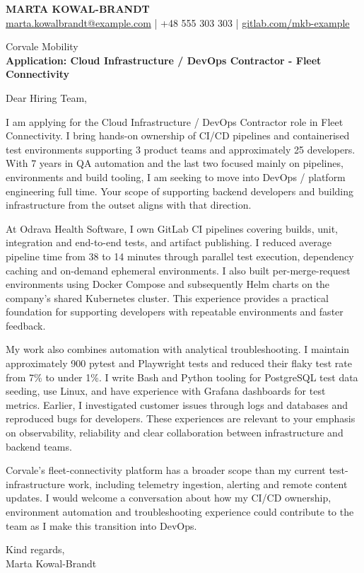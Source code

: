 \documentclass[11pt,a4paper]{article}
\begin{document}
{\Large\bfseries\color{primarycolor} MARTA KOWAL-BRANDT}\\
{\small \href{mailto:marta.kowalbrandt@example.com}{marta.kowalbrandt@example.com} | +48 555 303 303 | \href{https://gitlab.com/mkb-example}{gitlab.com/mkb-example}}

Corvale Mobility\\
\textbf{Application: Cloud Infrastructure / DevOps Contractor - Fleet Connectivity}

Dear Hiring Team,

I am applying for the Cloud Infrastructure / DevOps Contractor role in Fleet Connectivity. I bring hands-on ownership of CI/CD pipelines and containerised test environments supporting 3 product teams and approximately 25 developers. With 7 years in QA automation and the last two focused mainly on pipelines, environments and build tooling, I am seeking to move into DevOps / platform engineering full time. Your scope of supporting backend developers and building infrastructure from the outset aligns with that direction.

At Odrava Health Software, I own GitLab CI pipelines covering builds, unit, integration and end-to-end tests, and artifact publishing. I reduced average pipeline time from 38 to 14 minutes through parallel test execution, dependency caching and on-demand ephemeral environments. I also built per-merge-request environments using Docker Compose and subsequently Helm charts on the company's shared Kubernetes cluster. This experience provides a practical foundation for supporting developers with repeatable environments and faster feedback.

My work also combines automation with analytical troubleshooting. I maintain approximately 900 pytest and Playwright tests and reduced their flaky test rate from 7\% to under 1\%. I write Bash and Python tooling for PostgreSQL test data seeding, use Linux, and have experience with Grafana dashboards for test metrics. Earlier, I investigated customer issues through logs and databases and reproduced bugs for developers. These experiences are relevant to your emphasis on observability, reliability and clear collaboration between infrastructure and backend teams.

Corvale's fleet-connectivity platform has a broader scope than my current test-infrastructure work, including telemetry ingestion, alerting and remote content updates. I would welcome a conversation about how my CI/CD ownership, environment automation and troubleshooting experience could contribute to the team as I make this transition into DevOps.

Kind regards,\\
Marta Kowal-Brandt
\end{document}
